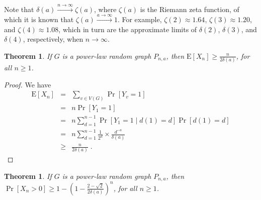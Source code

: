 \documentclass{article}
\newcommand{\st}{\;|\;}
\newcommand{\tendingtoinfty}[1]{\stackrel{#1 \rightarrow \infty}{\longrightarrow}}
\newtheorem{thm}[lem]{Theorem}
\begin{document}
Note that $\delta(a) \tendingtoinfty{n} \zeta(a)$, where $\zeta(a)$ is the
Riemann zeta function, of which it is known that
$\zeta(a) \tendingtoinfty{a} 1$. For example, $\zeta(2) \approx 1.64$,
$\zeta(3) \approx 1.20$, and $\zeta(4) \approx 1.08$, which in turn are the
approximate limits of $\delta(2)$, $\delta(3)$, and $\delta(4)$, respectively,
when $n \to \infty$.

\begin{thm}
\label{EXPna}
If $G$ is a power-law random graph $P_{n, a}$, then
$\mathrm{E}[X_n] \geq \frac{n}{2 \delta(a)}$, for all $n \geq 1$.
\end{thm}

\begin{proof}
We have
\begin{eqnarray*}
	 \mathrm{E}[X_n] & = & \sum_{v \in V(G)} \Pr[Y_v = 1] \\
		  & = & n \Pr[Y_1 = 1] \\
		  & = & n \sum_{d = 1}^{n - 1} \Pr[Y_1 = 1 \st d(1) = d] \Pr[d(1) = d] \\ 
		  & = & n \sum_{d = 1}^{n - 1}  \frac{1}{2^d} \times \frac{d^{-a}}{\delta(a)} \\
          & \geq & \frac{n}{2 \delta(a)} \;{.}
\end{eqnarray*}
\end{proof}

\begin{thm}
\label{PXPna}
If $G$ is a power-law random graph $P_{n, a}$, then
$\Pr[X_n > 0] \geq 1 - \left( 1 - \frac{2 - \sqrt{2}}{2\delta(a)} \right)^{n}$,
for all $n \geq 1$.
\end{thm}
\end{document}
